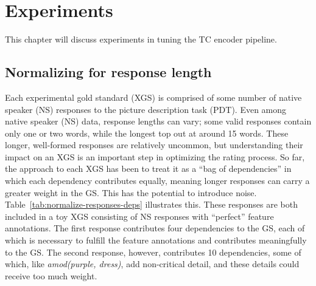 \chapter{Experiments}
\label{chap:experiments}
This chapter will discuss experiments in tuning the TC encoder pipeline.

\section{Normalizing for response length}
\label{section:experiment-normalizing-length}

Each experimental gold standard (XGS) is comprised of some number of native speaker (NS) responses to the picture description task (PDT). Even among native speaker (NS) data, response lengths can vary; some valid responses contain only one or two words, while the longest top out at around 15 words. These longer, well-formed responses are relatively uncommon, but understanding their impact on an XGS is an important step in optimizing the rating process. So far, the approach to each XGS has been to treat it as a ``bag of dependencies'' in which each dependency contributes equally, meaning longer responses can carry a greater weight in the GS. This has the potential to introduce noise. Table~\ref{tab:normalize-responses-deps} illustrates this. These responses are both included in a toy XGS consisting of NS responses with ``perfect'' feature annotations. The first response contributes four dependencies to the GS, each of which is necessary to fulfill the feature annotations and contributes meaningfully to the GS. The second response, however, contributes 10 dependencies, some of which, like \textit{amod(purple, dress)}, add non-critical detail, and these details could receive too much weight.


